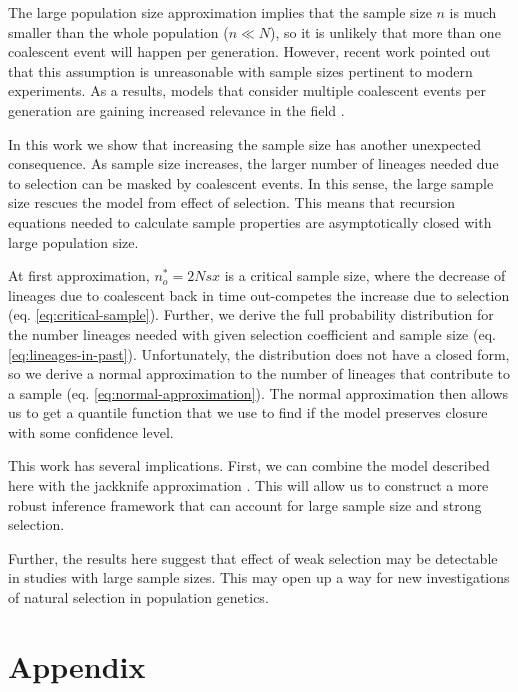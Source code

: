 \documentclass[review]{elsarticle}
\begin{document}
The large population size approximation implies that the sample size $n$ is much smaller than the
whole population ($n \ll N$), so it is unlikely that more than one coalescent event will happen per
generation. However, recent work \citep{BhaskarEtAl2014,NelsonEtAl2019} pointed out that this
assumption is unreasonable with sample sizes pertinent to modern experiments. As a results, models
that consider multiple coalescent events per generation are gaining increased relevance in the
field \citep{FlemmingtonVoit}.

In this work we show that increasing the sample size has another unexpected consequence. As sample
size increases, the larger number of lineages needed due to selection can be masked by coalescent
events. In this sense, the large sample size rescues the model from effect of selection. This means
that recursion equations needed to calculate sample properties are asymptotically closed with large
population size.

At first approximation, $n_o^*=2Nsx$ is a critical sample size, where the decrease of lineages due to
coalescent back in time out-competes the increase due to selection (eq. \eqref{eq:critical-sample}).
Further, we derive the full probability distribution for the number lineages needed with given
selection coefficient and sample size (eq. \eqref{eq:lineages-in-past}). Unfortunately, the
distribution does not have a closed form, so we derive a normal approximation to the number of
lineages that contribute to a sample (eq. \eqref{eq:normal-approximation}). The normal approximation
then allows us to get a quantile function that we use to find if the model preserves closure with
some confidence level.

This work has several implications. First, we can combine the model described here with the
jackknife approximation \citep{JouganousEtAl2017}. This will allow us to construct a more robust
inference framework that can account for large sample size and strong selection.

Further, the results here suggest that effect of weak selection may be detectable in studies with
large sample sizes. This may open up a way for new investigations of natural selection in population
genetics.



\section{Appendix}
\end{document}
